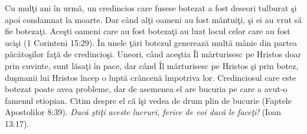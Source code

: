Cu mulţi ani în urmă, un credincios care fusese botezat a fost deseori tulburat şi apoi condamnat la moarte. Dar când alţi oameni au fost mântuiţi, şi ei au vrut să fie botezaţi. Aceşti oameni care au fost botezaţi au luat locul celor care au fost ucişi (1 Corinteni 15:29). În unele ţări botezul generează multă mânie din partea păcătoşilor faţă de credincioşi. Uneori, când aceştia Îl mărturisesc pe Hristos doar prin cuvinte, sunt lăsaţi în pace, dar când Îl mărturisesc pe Hristos şi prin botez, duşmanii lui Hristos încep o luptă crâncenă împotriva lor. Credinciosul care este botezat poate avea probleme, dar de asemenea el are bucuria pe care a avut-o famenul etiopian. Citim despre el că îşi vedea de drum plin de bucurie (Faptele Apostolilor 8:39).
\newline
\newline
\textit{Dacă ştiţi aceste lucruri, ferice de voi dacă le faceţi!} (Ioan 13:17).
